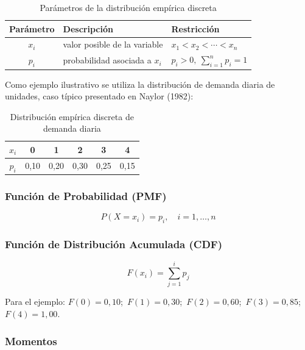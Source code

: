 \begin{table}[h!]
\centering
\begin{tabular}{|c|l|l|}
\hline
\textbf{Parámetro} & \textbf{Descripción} & \textbf{Restricción} \\
\hline
$x_i$ & valor posible de la variable & $x_1 < x_2 < \cdots < x_n$ \\
$p_i$ & probabilidad asociada a $x_i$ & $p_i > 0,\ \displaystyle\sum_{i=1}^n p_i = 1$ \\
\hline
\end{tabular}
\caption{Parámetros de la distribución empírica discreta}
\end{table}

Como ejemplo ilustrativo se utiliza la distribución de demanda diaria de unidades,
caso típico presentado en Naylor (1982):

\begin{table}[h!]
\centering
\begin{tabular}{|c|c|c|c|c|c|}
\hline
$x_i$ & 0 & 1 & 2 & 3 & 4 \\
\hline
$p_i$ & 0{,}10 & 0{,}20 & 0{,}30 & 0{,}25 & 0{,}15 \\
\hline
\end{tabular}
\caption{Distribución empírica discreta de demanda diaria}
\end{table}

\subsubsection{Función de Probabilidad (PMF)}

\begin{equation}
P(X = x_i) = p_i, \quad i = 1, \ldots, n
\end{equation}

\subsubsection{Función de Distribución Acumulada (CDF)}

\begin{equation}
F(x_i) = \sum_{j=1}^{i} p_j
\end{equation}

Para el ejemplo: $F(0) = 0{,}10$;\ $F(1) = 0{,}30$;\ $F(2) = 0{,}60$;\ $F(3) = 0{,}85$;\ $F(4) = 1{,}00$.

\subsubsection{Momentos}

